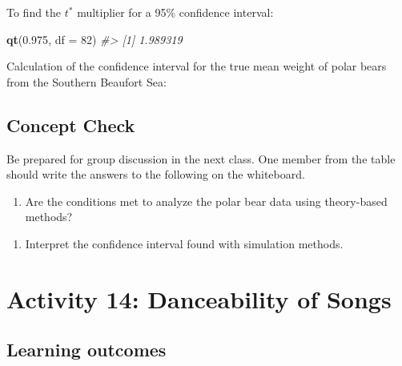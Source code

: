 \documentclass[
]{report}
\newenvironment{Shaded}{\begin{snugshade}}{\end{snugshade}}
\newcommand{\AttributeTok}[1]{\textcolor[rgb]{0.13,0.29,0.53}{#1}}
\newcommand{\CommentTok}[1]{\textcolor[rgb]{0.56,0.35,0.01}{\textit{#1}}}
\newcommand{\DecValTok}[1]{\textcolor[rgb]{0.00,0.00,0.81}{#1}}
\newcommand{\FloatTok}[1]{\textcolor[rgb]{0.00,0.00,0.81}{#1}}
\newcommand{\FunctionTok}[1]{\textcolor[rgb]{0.13,0.29,0.53}{\textbf{#1}}}
\newcommand{\NormalTok}[1]{#1}
\providecommand{\tightlist}{%
  \setlength{\itemsep}{0pt}\setlength{\parskip}{0pt}}
\begin{document}
\newpage

To find the \(t^*\) multiplier for a 95\% confidence interval:

\begin{Shaded}
\begin{Highlighting}[]
\FunctionTok{qt}\NormalTok{(}\FloatTok{0.975}\NormalTok{, }\AttributeTok{df =} \DecValTok{82}\NormalTok{)}
\CommentTok{\#\textgreater{} [1] 1.989319}
\end{Highlighting}
\end{Shaded}

Calculation of the confidence interval for the true mean weight of polar bears from the Southern Beaufort Sea:

\vspace{0.8in}

\subsection{Concept Check}\label{concept-check-6}

Be prepared for group discussion in the next class. One member from the table should write the answers to the following on the whiteboard.

\begin{enumerate}
\def\labelenumi{\arabic{enumi}.}
\tightlist
\item
  Are the conditions met to analyze the polar bear data using theory-based methods?
\end{enumerate}

\vspace{0.7in}

\begin{enumerate}
\def\labelenumi{\arabic{enumi}.}
\setcounter{enumi}{1}
\tightlist
\item
  Interpret the confidence interval found with simulation methods.
\end{enumerate}

\vspace{0.2in}

\newpage

\section{Activity 14: Danceability of Songs}\label{activity-14-danceability-of-songs}


\subsection{Learning outcomes}\label{learning-outcomes-14}
\end{document}
